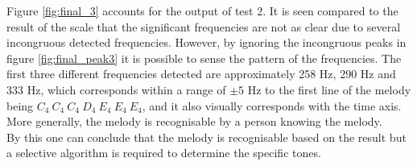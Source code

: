 Figure \ref{fig:final_3} accounts for the output of test 2. It is seen compared to the result of the scale that the significant frequencies are not as clear due to several incongruous detected frequencies. However, by ignoring the incongruous peaks in figure \ref{fig:final_peak3} it is possible to sense the pattern of the frequencies. The first three different frequencies detected are approximately 258 Hz, 290 Hz and 333 Hz, which corresponds within a range of $\pm 5$ Hz to the first line of the melody being $C_4 \ C_4 \ C_4 \ D_4 \ E_4 \ E_4 \ E_4$, and it also visually corresponds with the time axis. More generally, the melody is recognisable by a person knowing the melody. \\
By this one can conclude that the melody is recognisable based on the result but a selective algorithm is required to determine the specific tones.                  
\newpage

